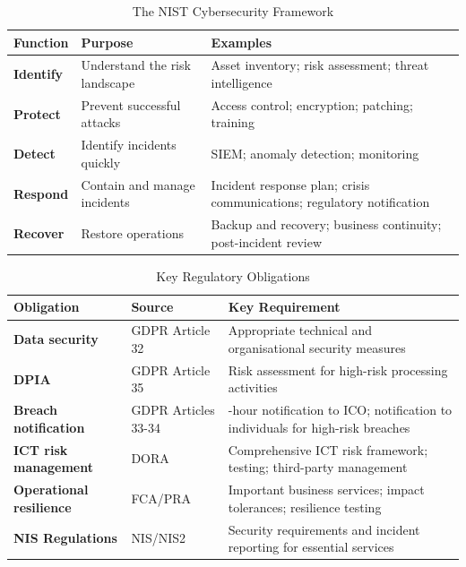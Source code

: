 \begin{table}[H]
  \centering
  \renewcommand{\arraystretch}{1.5}
  \begin{tabularx}{\textwidth}{ | >{\raggedright\arraybackslash}p{} 
								| >{\raggedright\arraybackslash}p{} 
                                | >{\raggedright\arraybackslash}X | }
    \hline
    \textbf{Function} & \textbf{Purpose} & \textbf{Examples} \\
    \hline
    \textbf{Identify} & Understand the risk landscape & Asset inventory; risk assessment; threat intelligence\\
    \hline
    \textbf{Protect} & Prevent successful attacks & Access control; encryption; patching; training\\
    \hline
    \textbf{Detect} & Identify incidents quickly & SIEM; anomaly detection; monitoring\\
    \hline
    \textbf{Respond} & Contain and manage incidents & Incident response plan; crisis communications; regulatory notification\\
    \hline
    \textbf{Recover} & Restore operations & Backup and recovery; business continuity; post-incident review\\
    \hline
  \end{tabularx}
  \caption{The NIST Cybersecurity Framework}
\end{table}

\begin{table}[H]
  \centering
  \renewcommand{\arraystretch}{1.5}
  \begin{tabularx}{\textwidth}{ | >{\raggedright\arraybackslash}p{} 
								| >{\raggedright\arraybackslash}p{} 
                                | >{\raggedright\arraybackslash}X | }
    \hline
    \textbf{Obligation} & \textbf{Source} & \textbf{Key Requirement} \\
    \hline
    \textbf{Data security} & GDPR Article 32 & Appropriate technical and organisational security measures\\
    \hline
    \textbf{DPIA} & GDPR Article 35 & Risk assessment for high-risk processing activities\\
    \hline
    \textbf{Breach notification} & GDPR Articles 33-34 & 72-hour notification to ICO; notification to individuals for high-risk breaches\\
    \hline
    \textbf{ICT risk management} & DORA & Comprehensive ICT risk framework; testing; third-party management\\
    \hline
    \textbf{Operational resilience} & FCA/PRA & Important business services; impact tolerances; resilience testing\\
    \hline
    \textbf{NIS Regulations} & NIS/NIS2 & Security requirements and incident reporting for essential services\\
    \hline
  \end{tabularx}
  \caption{Key Regulatory Obligations}
\end{table}

